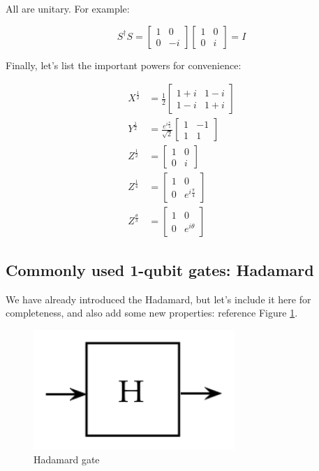 \documentclass[main.tex]{subfiles}
\begin{document}
    All are unitary. For example:
    
    $$
    S^{\dagger} S=\left[\begin{array}{cc}
    1 & 0 \\
    0 & -i
    \end{array}\right]\left[\begin{array}{ll}
    1 & 0 \\
    0 & i
    \end{array}\right]=I
    $$
    
    Finally, let's list the important powers for convenience:
    
    $$
    \begin{aligned}
    X^{\frac{1}{2}} &=\frac{1}{2}\left[\begin{array}{cc}
    1+i & 1-i \\
    1-i & 1+i
    \end{array}\right] \\
    Y^{\frac{1}{2}} &=\frac{e^{i \frac{\pi}{4}}}{\sqrt{2}}\left[\begin{array}{cc}
    1 & -1 \\
    1 & 1
    \end{array}\right] \\
    Z^{\frac{1}{2}} &=\left[\begin{array}{cc}
    1 & 0 \\
    0 & i
    \end{array}\right] \\
    Z^{\frac{1}{4}} &=\left[\begin{array}{cc}
    1 & 0 \\
    0 & e^{i \frac{\pi}{4}}
    \end{array}\right] \\
    Z^{\frac{\theta}{\pi}} &=\left[\begin{array}{cc}
    1 & 0 \\
    0 & e^{i \theta}
    \end{array}\right]
    \end{aligned}
    $$

\subsection{Commonly used 1-qubit gates: Hadamard}

    We have already introduced the Hadamard, but let's include it here for completeness, and also add some new properties: reference Figure \ref{fig:06gate5}.
    
    \begin{figure}
        \centering
        \includegraphics[width=3in]{notes/figs/n08/06gate5.png}
        \caption{Hadamard gate}
        \label{fig:06gate5}
    \end{figure}
    
\end{document}
